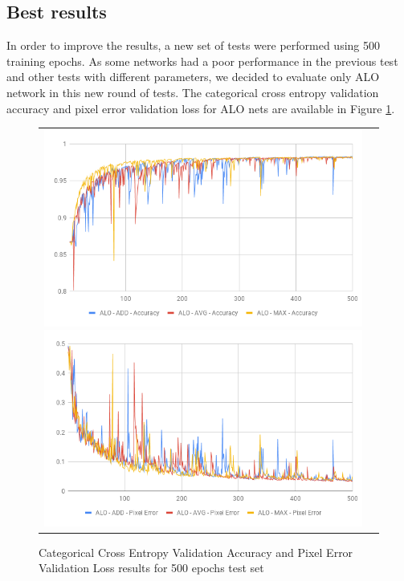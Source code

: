 \subsection{Best results}

In order to improve the results, a new set of tests were performed using 500 training epochs. As some networks had a poor performance in the previous test and other tests with different parameters, we decided to evaluate only ALO network in this new round of tests. The categorical cross entropy validation accuracy and pixel error validation loss for ALO nets are available in Figure \ref{fig:val_acc_500_epochs}.

\begin{figure}
  \caption{Categorical Cross Entropy Validation Accuracy and Pixel Error Validation Loss results for 500 epochs test set}
  \centering
  \begin{tabular}{ll}
    \includegraphics[width=1.\columnwidth]{figures/falreis/val_acc_500_epochs.png}
  
    \includegraphics[width=1.\columnwidth]{figures/falreis/pixel_error_500_epochs.png}
  \end{tabular}%
  \label{fig:val_acc_500_epochs}
\end{figure}

